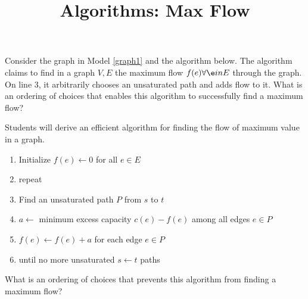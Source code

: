 \documentclass{tufte-handout}
\title{Algorithms: Max Flow}
\date{}
\begin{document}
\maketitle

\begin{questions}

\item Consider the graph in Model \ref{graph1} and the algorithm below. The algorithm claims to find in a graph $V, E$ the maximum flow $f(e) \forall \e in E$ through the graph. On line 3, it arbitrarily chooses an unsaturated path and adds flow to it. What is an ordering of choices that enables this algorithm to successfully find a maximum flow?

\begin{objective}
  Students will derive an efficient algorithm for finding the flow of maximum value in a graph.
\end{objective}

\begin{enumerate}
    \item Initialize $f(e) \leftarrow 0$ for all $e \in E$
    \item repeat
    \item \hspace{1cm} Find an unsaturated path $P$ from $s$ to $t$
    \item \hspace{1cm} $a \leftarrow$ minimum excess capacity $c(e) - f(e)$ among all edges $e \in P$
    \item \hspace{1cm} $f(e) \leftarrow f(e) + a$ for each edge $e \in P$
    \item until no more unsaturated $s \leftarrow t$ paths
\end{enumerate}

\item What is an ordering of choices that prevents this algorithm from finding a maximum flow?



\end{questions}
\end{document}
